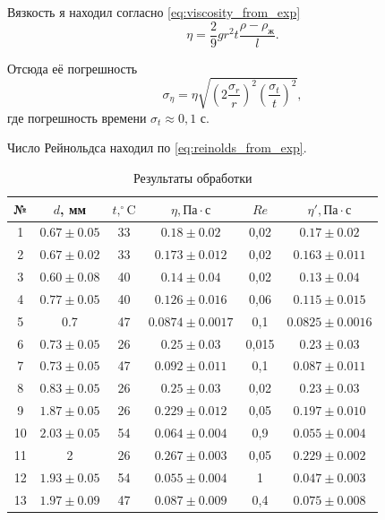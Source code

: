 \documentclass[12pt]{article}
\begin{document}
	Вязкость я находил согласно \eqref{eq:viscosity_from_exp}
	\begin{equation}
	\label{eq:viscosity_from_exp_working}
	\eta=\frac{2}{9} gr^2 t \frac{\rho -\rho_\text{ж}}{l}.
	\end{equation}
	
	Отсюда её погрешность
	\begin{equation}
	\label{eq:viscosity_from_exp_sigma}
	\sigma_\eta=\eta \sqrt{\left( 2\frac{\sigma_r}{r} \right)^2 \left( \frac{\sigma_t}{t} \right)^2},
	\end{equation}
	где погрешность времени $\sigma_t \approx 0{,}1$ с.
	
	Число Рейнольдса находил по \eqref{eq:reinolds_from_exp}.
	
	\begin{table}[h!]
	\caption{Результаты обработки}
	\label{table:results_obr}
	\begin{center}
	\begin{tabular}{|c|c|c|c|c|c|}
	\hline
	№ & $d$, мм & $t, ^\circ \text{C}$ & $\eta, \text{Па}\cdot \text{с}$ & $Re$ & $\eta', \text{Па}\cdot \text{с}$ \\
	\hline
	1 & $0.67\pm 0.05$ & 33 & $0.18\pm 0.02$ & 0,02 & $0.17\pm 0.02$  \\
	2 & $0.67\pm 0.02$ & 33 & $0.173\pm 0.012$ & 0,02 & $0.163\pm 0.011$ \\
	3 & $0.60\pm 0.08$ & 40 & $0.14\pm 0.04$ & 0,02 & $0.13\pm 0.04$ \\
	4 & $0.77\pm 0.05$ & 40 & $0.126\pm 0.016$ & 0,06 & $0.115\pm 0.015$ \\
	5 & 0.7 & 47 & $0.0874\pm 0.0017$ & 0,1 & $0.0825\pm 0.0016$ \\
	6 & $0.73\pm 0.05$ & 26 & $0.25\pm 0.03$ & 0,015 & $0.23\pm 0.03$ \\
	7 & $0.73\pm 0.05$ & 47 & $0.092\pm 0.011$ & 0,1 & $0.087\pm 0.011$ \\
	8 & $0.83\pm 0.05$ & 26 & $0.25\pm 0.03$ & 0,02 & $0.23\pm 0.03$ \\
	9 & $1.87\pm 0.05$ & 26 & $0.229\pm 0.012$ & 0,05 & $0.197\pm 0.010$ \\
	10 & $2.03\pm 0.05$ & 54 & $0.064\pm 0.004$ & 0,9 & $0.055\pm 0.004$ \\
	11 & 2 & 26 & $0.267\pm 0.003$ & 0,05 & $0.229\pm 0.002$ \\
	12 & $1.93\pm 0.05$ & 54 & $0.055\pm 0.004$ & 1 & $0.047\pm 0.003$ \\
	13 & $1.97\pm 0.09$ & 47 & $0.087\pm 0.009$ & 0,4 & $0.075\pm 0.008$ \\

\end{tabular}
\end{center}
\end{table}
\end{document}
